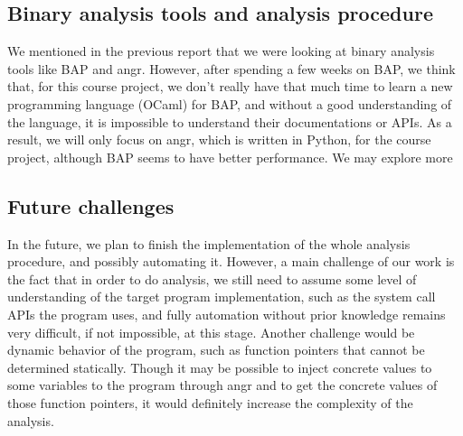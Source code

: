 \subsection{Binary analysis tools and analysis procedure}

We mentioned in the previous report that we were looking at binary analysis
tools like BAP and angr. However, after spending a few weeks on BAP, we think
that, for this course project, we don't really have that much time to learn a
new programming language (OCaml) for BAP, and without a good understanding of
the language, it is impossible to understand their documentations or APIs. As a
result, we will only focus on angr, which is written in Python, for the course
project, although BAP seems to have better performance. We may explore more

\subsection{Future challenges}

In the future, we plan to finish the implementation of the whole analysis
procedure, and possibly automating it. However, a main challenge of our work is
the fact that in order to do analysis, we still need to assume some level of
understanding of the target program implementation, such as the system call APIs
the program uses, and fully automation without prior knowledge remains very
difficult, if not impossible, at this stage. Another challenge would be dynamic
behavior of the program, such as function pointers that cannot be determined
statically. Though it may be possible to inject concrete values to some
variables to the program through angr and to get the concrete values of those
function pointers, it would definitely increase the complexity of the analysis.

